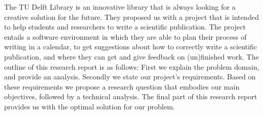 The TU Delft Library is an innovative library that is always looking for a creative solution for the future. They proposed us with a project that is intended to help students and researchers to write a scientific publication. The project entails a software environment in which they are able to plan their process of writing in a calendar, to get suggestions about how to correctly write a scientific publication, and where they can get and give feedback on (un)finished work.
The outline of this research report is as follows: First we explain the problem domain, and provide an analysis. Secondly we state our project's requirements. Based on these requirements we propose a research question that embodies our main objectives, followed by a technical analysis. The final part of this research report provides us with the optimal solution for our problem.